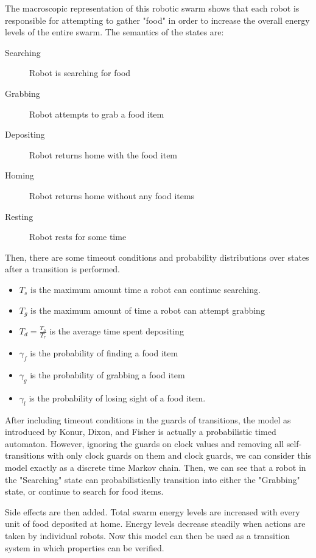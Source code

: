 \documentclass[11pt]{article}
\theoremstyle{definition}
\begin{document}
The macroscopic representation of this robotic swarm
shows that each robot is responsible for attempting
to gather "food" in order to increase the overall
energy levels of the entire swarm. The semantics
of the states are:

\begin{description}
    \item[Searching] Robot is searching for food
    \item[Grabbing] Robot attempts to grab a food item
    \item[Depositing] Robot returns home with the food item
    \item[Homing] Robot returns home without any food items
    \item[Resting] Robot rests for some time
\end{description}

Then, there are some timeout conditions and probability
distributions over states after a transition is performed.

\begin{itemize}
    \item $ T_s $ is the maximum amount time a robot can continue searching.
    \item $ T_g $ is the maximum amount of time a robot can attempt
        grabbing
    \item $ T_d = \frac{T_h}{T_r} $ is the average time spent depositing
    \item $ \gamma_f $ is the probability of finding a food item
    \item $ \gamma_g $ is the probability of grabbing a food item
    \item $ \gamma_l $ is the probability of losing sight of a food
        item.
\end{itemize}

After including timeout conditions in the guards
of transitions, the model as introduced by Konur, Dixon, and
Fisher is actually a probabilistic timed automaton. However,
ignoring the guards on clock values and removing all self-transitions
with only clock guards on them and clock guards, we can consider this model
exactly as a discrete time Markov chain. Then, we can see
that a robot in the "Searching" state can probabilistically
transition into either the "Grabbing" state, or continue to
search for food items.

Side effects are then added. Total swarm energy levels are increased
with every unit of food deposited at home. Energy levels decrease
steadily when actions are taken by individual
robots. Now this model can then be used as a transition system in
which properties can be verified.
\end{document}
